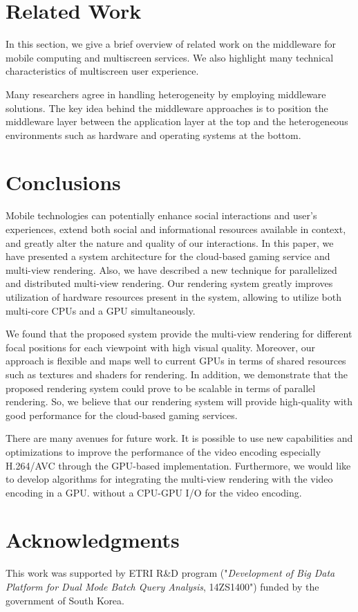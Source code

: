 \documentclass{sig-alternate}
\begin{document}
\section{Related Work}
\label{sc:RelatedWork}
In this section, we give a brief overview of related work on the middleware for mobile computing and multiscreen services. 
We also highlight many technical characteristics of multiscreen user experience.

Many researchers agree in handling heterogeneity by employing middleware solutions.
The key idea behind the middleware approaches is to position the middleware layer between the application layer at the top and the heterogeneous environments such as hardware and operating systems at the bottom. 

\section{Conclusions}
    \label{sc:Conclusion}
Mobile technologies can potentially enhance social interactions and user's experiences, extend both social and informational resources available in context, and greatly alter the nature and quality of our interactions.
    In this paper, we have presented a system architecture for the cloud-based gaming service and multi-view rendering.
    Also, we have described a new technique for parallelized and distributed multi-view rendering.
    Our rendering system greatly improves utilization of hardware resources present in the system, allowing to utilize both multi-core CPUs and a GPU simultaneously.

    We found that the proposed system provide the multi-view rendering for different focal positions for each viewpoint with high visual quality.
    Moreover, our approach is flexible and maps well to current GPUs in terms of shared resources such as textures and shaders for rendering.
    In addition, we demonstrate that the proposed rendering system could prove to be scalable in terms of parallel rendering. So, we believe that our rendering system will provide high-quality with good performance for the cloud-based gaming services.

    There are many avenues for future work. It is possible to use new capabilities and optimizations to improve the performance of the video encoding especially H.264/AVC through the GPU-based implementation.
    Furthermore, we would like to develop algorithms for integrating the multi-view rendering with the video encoding in a GPU.
    without a CPU-GPU I/O for the video encoding.


\section{Acknowledgments}
This work was supported by ETRI R\&D program ("\textit{Development of Big Data Platform for Dual Mode Batch Query Analysis}, 14ZS1400")
funded by the government of South Korea.

%

\end{document}
